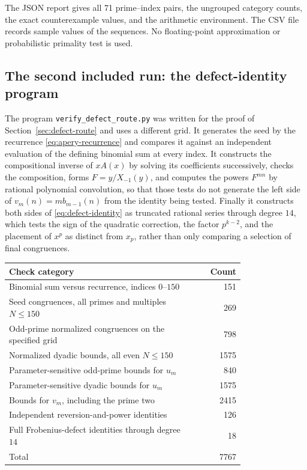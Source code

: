 \documentclass[11pt,letterpaper]{article}
\numberwithin{equation}{section}
\theoremstyle{definition}
\begin{document}
The JSON report gives all 71 prime--index pairs, the ungrouped category
counts, the exact counterexample values, and the arithmetic environment.
The CSV file records sample values of the sequences. No floating-point
approximation or probabilistic primality test is used.

\subsection{The second included run: the defect-identity program}

The program \texttt{verify\_defect\_route.py} was written for the proof
of Section~\ref{sec:defect-route} and uses a different grid. It generates
the seed by the recurrence \eqref{eq:apery-recurrence} and compares it
against an independent evaluation of the defining binomial sum at every
index. It constructs the compositional inverse of $xA(x)$ by solving its
coefficients successively, checks the composition, forms $F=y/X_{-1}(y)$,
and computes the powers $F^{mn}$ by rational polynomial convolution, so
that those tests do not generate the left side of $v_m(n)=mb_{m-1}(n)$
from the identity being tested. Finally it constructs both sides of
\eqref{eq:defect-identity} as truncated rational series through degree
$14$, which tests the sign of the quadratic correction, the factor
$p^{k-2}$, and the placement of $x^p$ as distinct from $x_p$, rather than
only comparing a selection of final congruences.

\begin{center}
\small
\begin{tabular}{p{0.78\linewidth}r}
\toprule
Check category & Count\\
\midrule
Binomial sum versus recurrence, indices $0$--$150$ & 151\\
Seed congruences, all primes and multiples $N\leq150$ & 269\\
Odd-prime normalized congruences on the specified grid & 798\\
Normalized dyadic bounds, all even $N\leq150$ & 1575\\
Parameter-sensitive odd-prime bounds for $u_m$ & 840\\
Parameter-sensitive dyadic bounds for $u_m$ & 1575\\
Bounds for $v_m$, including the prime two & 2415\\
Independent reversion-and-power identities & 126\\
Full Frobenius-defect identities through degree $14$ & 18\\
\midrule
Total & 7767\\
\bottomrule
\end{tabular}
\end{center}
\end{document}
